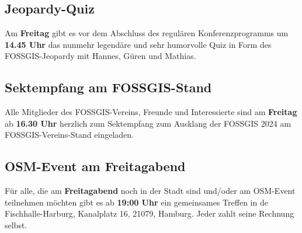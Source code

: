 \subsection*{Jeopardy-Quiz}
Am {\bfseries Freitag} gibt es vor dem Abschluss des regulären Konferenzprogramms um {\bfseries 14.45 Uhr} das nunmehr legendäre und sehr humorvolle Quiz in Form des FOSSGIS-Jeopardy mit Hannes, Güren und Mathias.

\subsection*{Sektempfang am FOSSGIS-Stand}
Alle Mitglieder des FOSSGIS-Vereins, Freunde und Interessierte sind am {\bfseries Freitag} ab {\bfseries 16.30 Uhr} herzlich zum Sektempfang zum Ausklang der FOSSGIS 2024 am FOSSGIS-Vereins-Stand eingeladen.

\subsection*{OSM-Event am Freitagabend}
Für alle, die am {\bfseries Freitagabend} noch in der Stadt sind und/oder am OSM-Event teilnehmen möchten gibt es ab {\bfseries 19:00 Uhr} ein gemeinsames Treffen in de Fischhalle-Harburg, Kanalplatz 16, 21079, Hamburg. Jeder zahlt seine Rechnung selbst.

\small
\label{platinsposoren}







\normalsize

